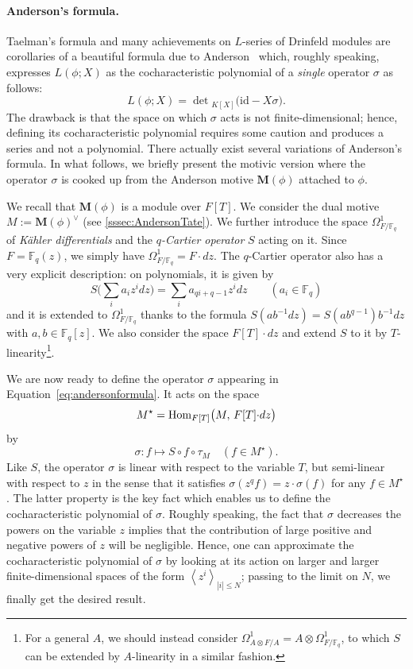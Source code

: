 \documentclass[11pt]{article}
\theoremstyle{definition}
\renewcommand\leq{\leqslant}
\newcommand\Fq{\mathbb{F}_q}
\newcommand{\Hom}{\text{\rm Hom}}
\newcommand{\MM}{\mathbf{M}}
\begin{document}
\paragraph{Anderson's formula.}

Taelman's formula and many achievements on $L$-series of Drinfeld
modules are corollaries of a beautiful formula due to 
Anderson~\cite{A20} which, roughly speaking, expresses $L(\phi;X)$ 
as the cocharacteristic polynomial of a \emph{single}  operator 
$\sigma$ as follows:
\begin{equation}
\label{eq:andersonformula}
  L(\phi; X) = \det{}_{K[X]} \big(\text{id} - X \sigma\big).
\end{equation}
The drawback is that the space on which $\sigma$ acts is not finite-dimensional; hence, defining its cocharacteristic polynomial
requires some caution and produces a series and not a polynomial.
There actually exist several variations of Anderson's formula.
In what follows, we briefly present the motivic version where the 
operator $\sigma$ is cooked up from the Anderson motive $\MM(\phi)$ 
attached to $\phi$. 

We recall that $\MM(\phi)$ is a module over $F[T]$. 
We consider the dual motive $M := \MM(\phi)^\vee$ (see
\cref{sssec:AndersonTate}).
We further introduce the space $\Omega^1_{F/\Fq}$ of \emph{Kähler 
differentials} and the \emph{$q$-Cartier operator} $S$ acting on it.
Since $F = \Fq(z)$, we simply have 
$\Omega^1_{F/\Fq} = F{\cdot} dz$. The $q$-Cartier operator also has a very explicit description: on polynomials, it is given by
\[
  S\Big(\sum_i a_i z^i dz \Big) = \sum_i a_{qi+q-1} z^i dz
  \qquad (a_i \in \Fq)
\]
and it is extended to $\Omega^1_{F/\Fq}$ thanks to the formula 
$S(a b^{-1} dz) = S(ab^{q-1}) b^{-1} dz$ with $a, b \in 
\Fq[z]$.
We also consider the space $F[T]{\cdot}dz$ and extend $S$ to it
by $T$-linearity\footnote{For a general $A$, we should instead consider
$\Omega^1_{A \otimes F / A} = A \otimes \Omega^1_{F/\Fq}$, to which
$S$ can be extended by $A$-linearity in a similar fashion.}.

We are now ready to define the operator $\sigma$ appearing in
Equation~\eqref{eq:andersonformula}. It acts on the space
\[
  M^\star = \Hom_{F[T]} \big(M, \, F[T]{\cdot}dz\big)
\]
by
\[ 
  \sigma : f \mapsto S \circ f \circ \tau_M \quad (f \in M^\star).
\]
Like $S$, the operator $\sigma$ is linear with respect to the variable 
$T$, but semi-linear with respect to $z$ in the sense that it 
satisfies $\sigma(z^q f) = z{\cdot} \sigma(f)$ for any 
$f \in M^\star$.
The latter property is the key fact which enables us to define the 
cocharacteristic polynomial of $\sigma$.
Roughly speaking, the fact that $\sigma$ decreases the powers on the
variable $z$ implies that the contribution of large positive and negative powers of $z$ will be negligible. Hence, one can approximate the cocharacteristic polynomial of $\sigma$ by 
looking at its action on larger and larger finite-dimensional spaces
of the form $\left<z^i\right>_{|i| \leq N}$; passing to the limit on $N$, we finally get the desired result.
\end{document}
